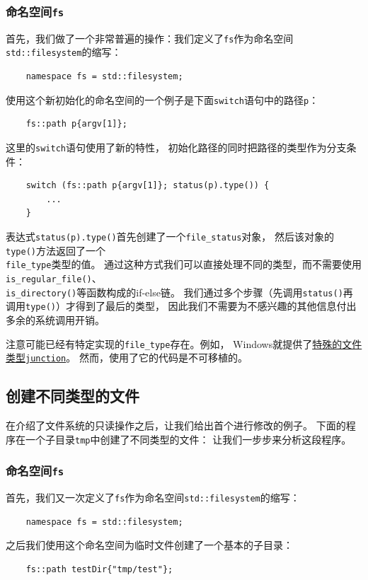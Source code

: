 \subsubsection{命名空间\texttt{fs}}
首先，我们做了一个非常普遍的操作：我们定义了\texttt{fs}作为命名空间
\texttt{std::filesystem}的缩写：
\begin{lstlisting}
    namespace fs = std::filesystem;
\end{lstlisting}
使用这个新初始化的命名空间的一个例子是下面\texttt{switch}语句中的路径\texttt{p}：
\begin{lstlisting}
    fs::path p{argv[1]};
\end{lstlisting}
这里的\texttt{switch}语句使用了新的特性，
初始化路径的同时把路径的类型作为分支条件：
\begin{lstlisting}
    switch (fs::path p{argv[1]}; status(p).type()) {
        ...
    }
\end{lstlisting}
表达式\texttt{status(p).type()}首先创建了一个\texttt{file\_status}对象，
然后该对象的\texttt{type()}方法返回了一个\\
\texttt{file\_type}类型的值。
通过这种方式我们可以直接处理不同的类型，而不需要使用\texttt{is\_regular\_file()}、\\
\texttt{is\_directory()}等函数构成的if-else链。
我们通过多个步骤（先调用\texttt{status()}再调用\texttt{type()}）才得到了最后的类型，
因此我们不需要为不感兴趣的其他信息付出多余的系统调用开销。

注意可能已经有特定实现的\texttt{file\_type}存在。例如，
Windows就提供了\hyperref[junction]{特殊的文件类型\texttt{junction}}。
然而，使用了它的代码是不可移植的。

\subsection{创建不同类型的文件}\label{ch20.1.3}
在介绍了文件系统的只读操作之后，让我们给出首个进行修改的例子。
下面的程序在一个子目录\texttt{tmp}中创建了不同类型的文件：
让我们一步步来分析这段程序。

\subsubsection{命名空间\texttt{fs}}
首先，我们又一次定义了\texttt{fs}作为命名空间\texttt{std::filesystem}的缩写：
\begin{lstlisting}
    namespace fs = std::filesystem;
\end{lstlisting}
之后我们使用这个命名空间为临时文件创建了一个基本的子目录：
\begin{lstlisting}
    fs::path testDir{"tmp/test"};
\end{lstlisting}

